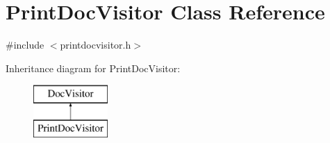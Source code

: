 \hypertarget{class_print_doc_visitor}{}\section{Print\+Doc\+Visitor Class Reference}
\label{class_print_doc_visitor}


{\ttfamily \#include $<$printdocvisitor.\+h$>$}

Inheritance diagram for Print\+Doc\+Visitor\+:\begin{figure}[H]
\begin{center}
\leavevmode
\includegraphics[height=2.000000cm]{class_print_doc_visitor}
\end{center}
\end{figure}
